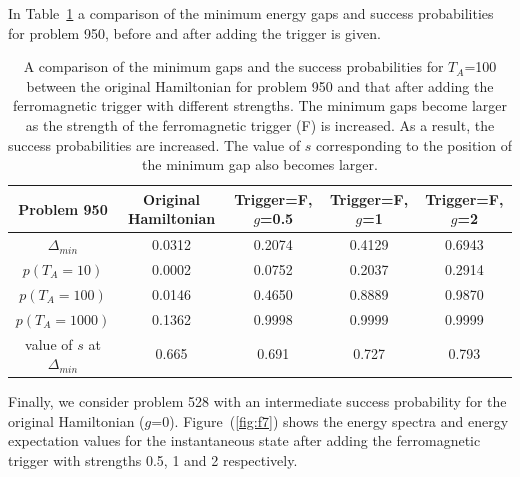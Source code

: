 \documentclass[../main.tex]{subfiles}
\begin{document}
In Table~\ref{tab:f2} a comparison of the minimum energy gaps and success probabilities for problem 950, before and after adding the trigger is given.
\begin{table}[H]
\centering
\renewcommand{\arraystretch}{1.3}
\begin{tabular}{|c|c|c|c|c|}
\hline 
Problem 950 & Original Hamiltonian & Trigger=F, $g$=0.5 & Trigger=F, $g$=1 & Trigger=F, $g$=2 \\ 
\hline 
$\Delta_{min}$ & 0.0312 & 0.2074 & 0.4129 & 0.6943 \\ 
\hline 
$p(T_A=10)$ & 0.0002 & 0.0752 & 0.2037 & 0.2914 \\ 
\hline 
$p(T_A=100)$ & 0.0146 & 0.4650 & 0.8889 & 0.9870 \\ 
\hline 
$p(T_A=1000)$ & 0.1362 & 0.9998 & 0.9999 & 0.9999 \\ 
\hline 
value of $s$ at $\Delta_{min}$ & 0.665 & 0.691 & 0.727 & 0.793 \\
\hline

\end{tabular} 
\caption{A comparison of the minimum gaps and the success probabilities for $T_A$=100 between the original Hamiltonian for problem 950 and that after adding the  ferromagnetic trigger with different strengths. The minimum gaps become larger as the strength of the ferromagnetic trigger (F) is increased. As a result, the success probabilities are increased. The value of $s$ corresponding to the position of the minimum gap also becomes larger.}
\label{tab:f2}
\end{table}

Finally, we consider problem 528 with an intermediate success probability for the original Hamiltonian ($g$=0). Figure~(\ref{fig:f7}) shows the energy spectra and energy expectation values for the instantaneous state after adding the ferromagnetic trigger with strengths 0.5, 1 and 2 respectively.
\end{document}
